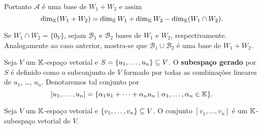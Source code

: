 \begin{prova}
	Portanto $\mathcal{A}$ \'e uma base de $W_1 + W_2$ e assim
	\[
		\dim_{\mathbb{K}}(W_1 + W_2) = \dim_{\mathbb{K}}W_1 + \dim_{\mathbb{K}}W_2 - \dim_{\mathbb{K}}(W_1 \cap W_2).
	\]

	Se $W_1 \cap W_2 = \{0_V\}$, sejam $\mathcal{B}_1$ e $\mathcal{B}_2$ bases de $W_1$ e $W_2$, respectivamente. Analogamente ao caso anterior, mostra-se que $\mathcal{B}_1 \cup \mathcal{B}_2$ \'e uma base de $W_1 + W_2$.
\end{prova}

\begin{definicao}
	Seja $V$ um $\mathbb{K}$-espa\c{c}o vetorial e $S = \{u_1,\dots,u_n\} \subseteq V$. O \textbf{subespa\c{c}o gerado} por $S$ \'e definido como o subconjunto de $V$ formado por todas as combina\c{c}\~oes lineares de $u_1$, \dots, $u_n$. Denotaremos tal conjunto por
	\[
		[u_1,\dots,u_n] = \{\alpha_1u_1 + \cdots + \alpha_nu_n \mid \alpha_1, \dots, \alpha_n \in \mathbb{K}\}.
	\]
\end{definicao}

\begin{proposicao}
	Seja $V$ um $\mathbb{K}$-espa\c{c}o vetorial e $\{v_1,\dots,v_n\} \subseteq V$. O conjunto $[v_1,\dots,v_n]$ \'e um $\mathbb{K}$-subespa\c{c}o vetorial de $V$.
\end{proposicao}

